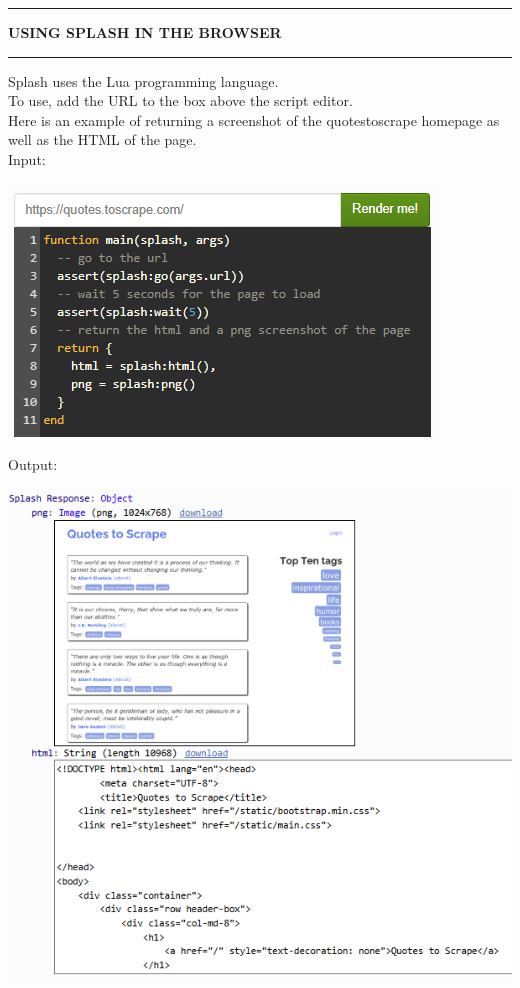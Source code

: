\documentclass[8pt]{extarticle}
\newcommand{\heading}[1]{%
    \noindent
    \rule{\linewidth}{0.4pt}
    \begin{center}
        \vspace{-1ex}
        \textbf{#1}        
        \vspace{-2.5ex}
    \end{center}
    \rule{\linewidth}{0.4pt}
}
\begin{document}
\begin{multicols}{3}
\heading{USING SPLASH IN THE BROWSER}

Splash uses the Lua programming language.\\

To use, add the URL to the box above the script editor. \\

Here is an example of returning a screenshot of the quotestoscrape homepage as well as the HTML of the page. \\

Input:

\begin{center}
    \includegraphics[width=0.8\columnwidth]{images/splash_example_input.png}
\end{center}

Output:

\begin{center}
    \includegraphics[width=0.9\columnwidth]{images/splash_example_output.png}
\end{center}


\end{multicols}
\end{document}
